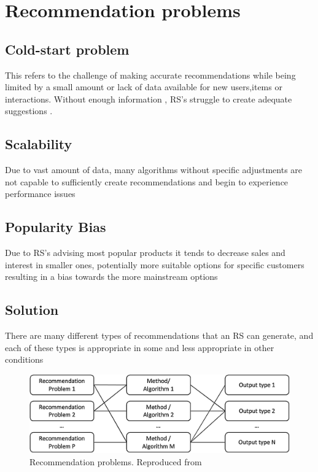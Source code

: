 \documentclass[10pt,twoside,english,a4paper]{article}
\begin{document}
\section{Recommendation problems}

\subsection{Cold-start problem}
This refers to the challenge of making accurate recommendations while being limited by a small amount or lack of data available for new users,items or interactions. Without enough information , RS's struggle to create adequate suggestions .

\subsection{Scalability}
Due to vast amount of data, many algorithms without specific adjustments are not capable to sufficiently create recommendations and begin to experience performance issues

\subsection{Popularity Bias}
Due to RS's advising most popular products it tends to decrease sales and interest in smaller ones, potentially more suitable options for specific customers resulting in a bias towards the more mainstream options


\subsection{Solution}
There are many different types of recommendations that an RS can generate, and each of these types is appropriate in some and less appropriate in other conditions



\begin{figure}[H]
	\includegraphics[width=1\textwidth]{./diagrams/recommendation_problems.jpg}
	\caption{Recommendation problems. Reproduced from \cite{GORGOGLIONE2019103143}}
	\label{fig:fig4}
\end{figure}
\end{document}

